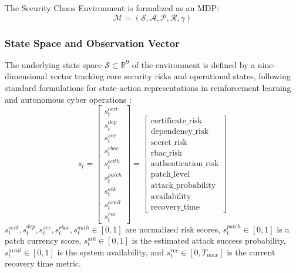 \documentclass[pdflatex,sn-mathphys-num]{sn-jnl}%
\theoremstyle{thmstyleone}%
\theoremstyle{thmstyletwo}%
\theoremstyle{thmstylethree}%
\begin{document}
	The Security Chaos Environment is formalized as an MDP:
	\begin{equation}
		\mathcal{M} = (\mathcal{S}, \mathcal{A}, \mathcal{P}, \mathcal{R}, \gamma)
	\end{equation}
	
	\subsubsection{State Space and Observation Vector}
	
	The underlying state space $\mathcal{S} \subset \mathbb{R}^9$ of the environment is defined by a nine-dimensional vector tracking core security risks and operational states, following standard formulations for state-action representations in reinforcement learning \cite{silver2016mastering, mnih2015human} and autonomous cyber operations \cite{standen2021cyborg}: 
	\begin{equation}
		s_t = \begin{bmatrix}
			s_t^{cert} \\
			s_t^{dep} \\
			s_t^{sec} \\
			s_t^{rbac} \\
			s_t^{auth} \\
			s_t^{patch} \\
			s_t^{atk} \\
			s_t^{avail} \\
			s_t^{rec}
		\end{bmatrix}
		= \begin{bmatrix}
			\text{certificate\_risk} \\
			\text{dependency\_risk} \\
			\text{secret\_risk} \\
			\text{rbac\_risk} \\
			\text{authentication\_risk} \\
			\text{patch\_level} \\
			\text{attack\_probability} \\
			\text{availability} \\
			\text{recovery\_time}
		\end{bmatrix}
	\end{equation}
	$s_t^{cert}, s_t^{dep}, s_t^{sec}, s_t^{rbac}, s_t^{auth} \in [0, 1]$ are normalized risk scores, $s_t^{patch} \in [0, 1]$ is a patch currency score, $s_t^{atk} \in [0, 1]$ is the estimated attack success probability, $s_t^{avail} \in [0, 1]$ is the system availability, and $s_t^{rec} \in [0, T_{max}]$ is the current recovery time metric. 
	
\end{document}
